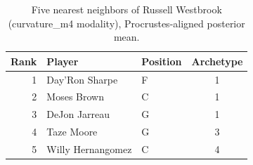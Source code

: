 \begin{table}[htbp]
  \centering\small
  \begin{tabular}{rllc}
    \toprule
    Rank & Player & Position & Archetype \\
    \midrule
    1 & Day'Ron Sharpe & F & 1 \\
    2 & Moses Brown & C & 1 \\
    3 & DeJon Jarreau & G & 1 \\
    4 & Taze Moore & G & 3 \\
    5 & Willy Hernangomez & C & 4 \\
    \bottomrule
  \end{tabular}
  \caption{Five nearest neighbors of Russell Westbrook (curvature_m4 modality), Procrustes-aligned posterior mean.}
  \label{tab:Russell_Westbrook_neighbors_curvature_m4}
\end{table}

